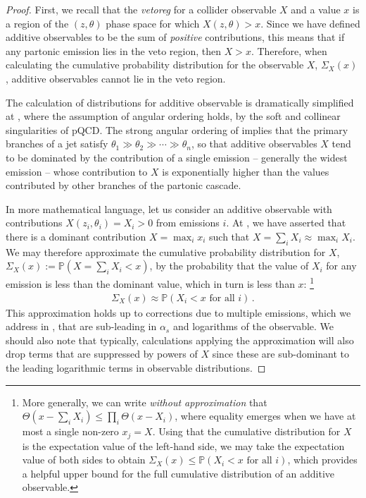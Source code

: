 \begin{proof}

First, we recall that the \emph{\gls{vetoreg}} for a collider observable \(X\) and a value \(x\) is a region of the \((z, \theta)\) phase space for which \(X(z,\theta) > x\).
%
Since we have defined additive observables to be the sum of \textit{positive} contributions, this means that if any partonic emission lies in the veto region, then \(X > x\).
%
Therefore, when calculating the cumulative probability distribution for the observable \(X\), \(\Sigma_X(x)\), additive observables cannot lie in the veto region.

The calculation of distributions for additive observable is dramatically simplified at , where the assumption of angular ordering holds, by the soft and collinear singularities of pQCD.
%
The strong angular ordering of  implies that the primary branches of a jet  satisfy \(\theta_1 \gg \theta_2 \gg \cdots \gg \theta_n\), so that additive observables \(X\) tend to be dominated by the contribution of a single emission -- generally the widest emission -- whose contribution to \(X\) is exponentially higher than the values contributed by other branches of the partonic cascade.

In more mathematical language, let us consider an additive observable with contributions \(X(z_i, \theta_i) = X_i > 0\) from emissions \(i\).
%
At , we have asserted that there is a dominant contribution \(X = \max_i x_i\) such that \(X = \sum_i X_i \approx \max_i X_i\).
%
We may therefore approximate the cumulative probability distribution for \(X\), \(\Sigma_X(x) := \mathbb{P}(X = \sum_i X_i < x)\), by the probability that the value of \(X_i\) for any emission is less than the dominant value, which in turn is less than \(x\):%
\footnote{
    More generally, we can write \textit{without approximation} that \(\Theta(x - \sum_i X_i) \leq \prod_i \Theta(x - X_i)\), where equality emerges when we have at most a single non-zero \(x_j = X\).
    Using that the cumulative distribution for \(X\) is the expectation value of the left-hand side, we may take the expectation value of both sides to obtain \(\Sigma_X(x) \leq \mathbb{P}(X_i < x \text{ for all } i)\), which provides a helpful upper bound for the full cumulative distribution of an additive observable.
}
\begin{align}
    \Sigma_X(x) \approx \mathbb{P}(X_i < x \text{ for all } i)
    \,.
\end{align}
%
This approximation holds up to corrections due to multiple emissions, which we address in , that are sub-leading in \(\alpha_s\) and logarithms of the observable.
%
We should also note that typically, calculations applying the  approximation will also drop terms that are suppressed by powers of \(X\) since these are sub-dominant to the leading logarithmic terms in observable distributions.
\end{proof}


